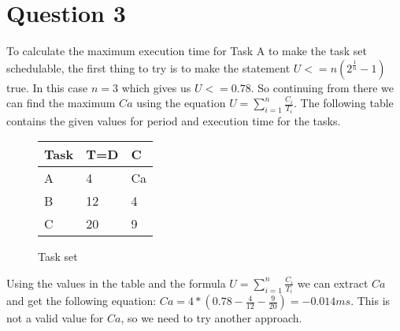 \section{Question 3}

    To calculate the maximum execution time for Task A to make the task set schedulable, the first thing to try is to make the statement $U <= n(2^{\frac{1}{n}} - 1)$ true. In this case $n = 3$ which gives us $U <= 0.78$. So continuing from there we can find the maximum $Ca$ using the equation $U = \sum_{i=1}^{n} \frac{C_i}{T_i}$. The following table contains the given values for period and execution time for the tasks.
    \renewcommand{\arraystretch}{1.4}
        \begin{figure}[H]
        \centering
        \begin{minipage}{0.5\textwidth}
            \begin{table}[H]
            \centering
            \begin{tabular}{|l|l|l|}
                \hline
                \textbf{Task}   & \textbf{T=D}  & \textbf{C}  \\ \hline
                A               & 4             & Ca          \\ \hline
                B               & 12            & 4           \\ \hline
                C               & 20            & 9           \\ \hline
            \end{tabular}
            \end{table}
        \end{minipage}%
        \caption{Task set}
        \label{fig:Q3tasks}
        \end{figure}
    \renewcommand{\arraystretch}{1.0}

    Using the values in the table and the formula $U = \sum_{i=1}^{n} \frac{C_i}{T_i}$ we can extract $Ca$ and get the following equation: $Ca = 4*(0.78 - \frac{4}{12} - \frac{9}{20}) = -0.014ms$. This is not a valid value for $Ca$, so we need to try another approach.\\
    
